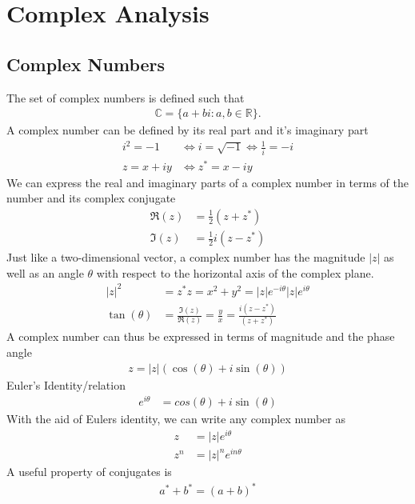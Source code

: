 \chapter{Complex Analysis}
\thispagestyle{fancy}
\section{Complex Numbers}
\begin{multicols}{2}
The set of complex numbers is defined such that
\begin{align}
\mathbb{C}=\{a+bi : a,b \in \mathbb{R}\}.
\end{align}
A complex number can be defined by its real part and it's imaginary part
\begin{align}
i^2 = -1 &\Longleftrightarrow i=\sqrt{-1} \Longleftrightarrow \frac{1}{i}=-i\\
z = x+iy &\Longleftrightarrow z^*=x-iy 
\end{align}
We can express the real and imaginary parts of a complex number in terms of the number and its complex conjugate
\begin{align}
\mathfrak{R}(z)&= \frac{1}{2}(z+z^*) \\
\mathfrak{I}(z)&= \frac{1}{2}i(z-z^*) 
\end{align}
Just like a two-dimensional vector, a complex number has the magnitude $|z|$ as well as an angle $\theta$ with respect to the horizontal axis of the complex plane.
\begin{align}
|z|^2 &= z^* z=x^2+y^2=|z|e^{-i\theta}|z|e^{i\theta} \\
\tan(\theta) &= \frac{\mathfrak{I}(z)}{\mathfrak{R}(z)}  = \frac{y}{x} = \frac{i(z-z^*)}{(z+z^*)}
\end{align}
A complex number can thus be expressed in terms of magnitude and the phase angle
\begin{align}
z=|z|(\cos(\theta)+i\sin(\theta))
\end{align}
Euler's Identity/relation
\begin{align}
e^{i\theta}&=cos(\theta)+i\sin(\theta)
\end{align}
With the aid of Eulers identity, we can write any complex number as
\begin{align}
z&=|z|e^{i\theta} \\
z^n&=|z|^ne^{in\theta}
\end{align}
A useful property of conjugates is
\begin{align}
	a^*+b^*=(a+b)^*
\end{align}
\end{multicols}
